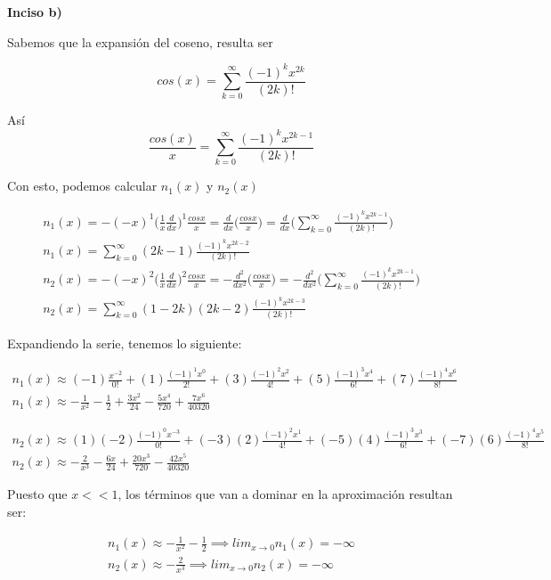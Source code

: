 \documentclass[10pt]{article}
\begin{document}
\textbf{Inciso b)}

Sabemos que la expansión del coseno, resulta ser 

$$cos(x)=\sum_{k=0}^{\infty}\frac{(-1)^{k}x^{2k}}{(2k)!}$$

Así 
$$\frac{cos(x)}{x}=\sum_{k=0}^{\infty}\frac{(-1)^{k}x^{2k-1}}{(2k)!}$$

Con esto, podemos calcular $n_{1}(x)$ y $n_{2}(x)$

\begin{align*}
    n_{1}(x)=-(-x)^{1}\bigg( \frac{1}{x}\frac{d}{dx} \bigg)^{1}\frac{cosx}{x}=\frac{d}{dx}\bigg( \frac{cosx}{x}\bigg)=\frac{d}{dx}\bigg( \sum_{k=0}^{\infty}\frac{(-1)^{k}x^{2k-1}}{(2k)!}\bigg) \\
    n_{1}(x)=\sum_{k=0}^{\infty}(2k-1)\frac{(-1)^{k}x^{2k-2}}{(2k)!} \\
    n_{2}(x)=-(-x)^{2}\bigg( \frac{1}{x}\frac{d}{dx} \bigg)^{2}\frac{cosx}{x}=-\frac{d^{2}}{dx^{2}}\bigg( \frac{cosx}{x} \bigg)=-\frac{d^{2}}{dx^{2}}\bigg( \sum_{k=0}^{\infty}\frac{(-1)^{k}x^{2k-1}}{(2k)!} \bigg) \\
    n_{2}(x)=\sum_{k=0}^{\infty}(1-2k)(2k-2)\frac{(-1)^{k}x^{2k-3}}{(2k)!}
\end{align*}
\medskip

Expandiendo la serie, tenemos lo siguiente: 

\begin{align*}
    n_{1}(x)\approx (-1)\frac{x^{-2}}{0!}+(1)\frac{(-1)^{1}x^{0}}{2!} + (3)\frac{(-1)^{2}x^{2}}{4!}+(5)\frac{(-1)^{3}x^{4}}{6!}+(7)\frac{(-1)^{4}x^{6}}{8!}\\
    n_{1}(x) \approx -\frac{1}{x^{2}}-\frac{1}{2}+\frac{3x^{2}}{24}-\frac{5x^{4}}{720}+\frac{7x^{6}}{40320}
\end{align*}

\begin{align*}
    n_{2}(x) \approx (1)(-2)\frac{(-1)^{0}x^{-3}}{0!}+(-3)(2)\frac{(-1)^{2}x^{1}}{4!}+(-5)(4)\frac{(-1)^{3}x^{3}}{6!}+(-7)(6)\frac{(-1)^{4}x^{5}}{8!} \\
    n_{2}(x) \approx -\frac{2}{x^{3}}-\frac{6x}{24}+\frac{20x^{3}}{720}-\frac{42x^{5}}{40320}
\end{align*}

Puesto que $x<<1$, los términos que van a dominar en la aproximación resultan ser:

\begin{align*}
    n_{1}(x) \approx -\frac{1}{x^{2}}-\frac{1}{2} \implies lim_{x \to 0} n_{1}(x) = -\infty \\
    n_{2}(x) \approx -\frac{2}{x^{3}} \implies lim_{x\to 0} n_{2}(x) = -\infty 
\end{align*}
\end{document}
